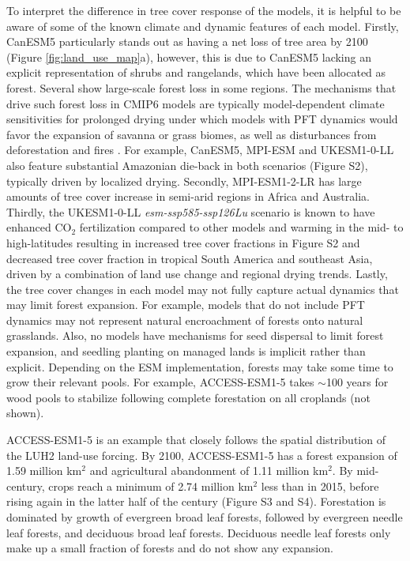\documentclass[draft]{agujournal2019}
\begin{document}
To interpret the difference in tree cover response of the models, it is helpful to be aware of some of the known climate and dynamic features of each model.
Firstly, CanESM5 particularly stands out as having a net loss of tree area by 2100 (Figure \ref{fig:land_use_map}a), however, this is due to CanESM5 lacking an explicit representation of shrubs and rangelands, which have been allocated as forest.
Several show large-scale forest loss in some regions.
The mechanisms that drive such forest loss in CMIP6 models are typically model-dependent climate sensitivities for prolonged drying under which models with PFT dynamics would favor the expansion of savanna or grass biomes, as well as disturbances from deforestation and fires \cite{cano-abrupt-2022,parry-evidence-2022}.
For example, CanESM5, MPI-ESM and UKESM1-0-LL also feature substantial Amazonian die-back in both scenarios (Figure S2), typically driven by localized drying.
Secondly, MPI-ESM1-2-LR has large amounts of tree cover increase in semi-arid regions in Africa and Australia.
Thirdly, the UKESM1-0-LL \textit{esm-ssp585-ssp126Lu} scenario is known to have enhanced CO$_2$ fertilization compared to other models and warming in the mid- to high-latitudes resulting in increased tree cover fractions in Figure S2 and decreased tree cover fraction in tropical South America and southeast Asia, driven by a combination of land use change and regional drying trends.
Lastly, the tree cover changes in each model may not fully capture actual dynamics that may limit forest expansion.
For example, models that do not include PFT dynamics may not represent natural encroachment of forests onto natural grasslands.
Also, no models have mechanisms for seed dispersal to limit forest expansion, and seedling planting on managed lands is implicit rather than explicit.
Depending on the ESM implementation, forests may take some time to grow their relevant pools.
For example, ACCESS-ESM1-5 takes {$\sim$}100 years for wood pools to stabilize following complete forestation on all croplands (not shown).

ACCESS-ESM1-5 is an example that closely follows the spatial distribution of the LUH2 land-use forcing.
By 2100, ACCESS-ESM1-5 has a forest expansion of 1.59 million km$^2$ and agricultural abandonment of 1.11 million km$^2$.
By mid-century, crops reach a minimum of 2.74 million km$^2$ less than in 2015, before rising again in the latter half of the century (Figure S3 and S4).
Forestation is dominated by growth of evergreen broad leaf forests, followed by evergreen needle leaf forests, and deciduous broad leaf forests.
Deciduous needle leaf forests only make up a small fraction of forests and do not show any expansion.
\end{document}
